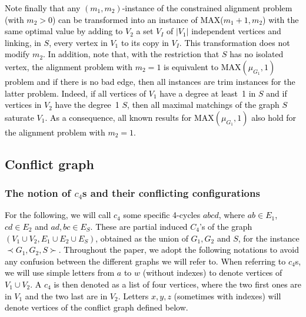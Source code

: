 \documentclass[final]{dmtcs-episciences}
\newcommand\mar[1]{\textcolor{black}{#1}}
\newcommand\ces[1]{\textcolor{black}{#1}}
\begin{document}
 \mar{Note finally that any $(m_1,m_2)$-instance of the constrained alignment problem (with $m_2>0$) can be transformed into an  instance of MAX($m_1+1, m_2$) with the same optimal value by adding to $V_2$ a set $V_I$ of $|V_1|$ independent vertices and linking, in $S$, every vertex in $V_1$ to its copy in $V_I$. This transformation does not modify $m_2$. In addition, note that, with the restriction that $S$ has no isolated vertex, the alignment problem with $m_2=1$ is equivalent to {MAX}$(\mu_{G_1},1)$ problem and if there is no bad edge, then all instances are trim instances for the latter problem. Indeed, if all vertices of $V_1$  have a degree at least~1 in $S$ and if vertices in $V_2$ have the degree~1 $S$, then all maximal matchings of the graph $S$ saturate $V_1$. As a consequence, all known results  for {MAX}$(\mu_{G_1},1)$ also hold for the alignment problem with $m_2=1$.} 


\subsection{Conflict graph}\label{subsec:conflict}
 
 \subsubsection{The notion of $c_4$s and their conflicting configurations}
\ces{For the following,  we will call $c_4$ some specific 4-cycles   $abcd$, where 
$ab\in E_1$, $cd \in E_2$ and $ad,bc \in E_S$. These are partial induced $C_4$'s of the graph $(V_1\cup V_2, E_1\cup E_2\cup E_S)$, obtained as the union of $G_1, G_2$ and $S$, for the instance $\prec G_1, G_2, S \succ$.} 
\mar{Throughout the paper, we adopt the following notations to avoid any confusion between the different graphs we will refer to. When referring to $c_4$s, we will use simple letters from $a$ to $w$ (without indexes) to denote vertices of $V_1\cup V_2$. A $c_4$ is then denoted as a list of four vertices, where the two first ones are in $V_1$ and the two last are in $V_2$. Letters $x,y,z$ (sometimes with indexes) will denote vertices of the conflict graph defined below.}
\end{document}
